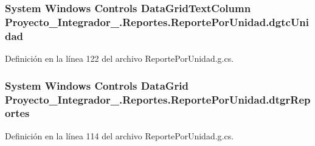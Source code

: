 \hypertarget{class_proyecto___integrador__3_1_1_reportes_1_1_reporte_por_unidad_ad4cc063b8f6a657a37503bdb747f45ea}{
\subsubsection[{dgtc\-Unidad}]{\setlength{\rightskip}{0pt plus 5cm}System Windows Controls Data\-Grid\-Text\-Column Proyecto\-\_\-\-Integrador\-\_.\-Reportes.\-Reporte\-Por\-Unidad.\-dgtc\-Unidad\hspace{0.3cm}{\ttfamily [package]}}}\label{class_proyecto___integrador__3_1_1_reportes_1_1_reporte_por_unidad_ad4cc063b8f6a657a37503bdb747f45ea}


Definición en la línea 122 del archivo Reporte\-Por\-Unidad.\-g.\-cs.

\hypertarget{class_proyecto___integrador__3_1_1_reportes_1_1_reporte_por_unidad_ac4501015e077f29cb4a26566d9debe50}{
\subsubsection[{dtgr\-Reportes}]{\setlength{\rightskip}{0pt plus 5cm}System Windows Controls Data\-Grid Proyecto\-\_\-\-Integrador\-\_.\-Reportes.\-Reporte\-Por\-Unidad.\-dtgr\-Reportes\hspace{0.3cm}{\ttfamily [package]}}}\label{class_proyecto___integrador__3_1_1_reportes_1_1_reporte_por_unidad_ac4501015e077f29cb4a26566d9debe50}


Definición en la línea 114 del archivo Reporte\-Por\-Unidad.\-g.\-cs.


